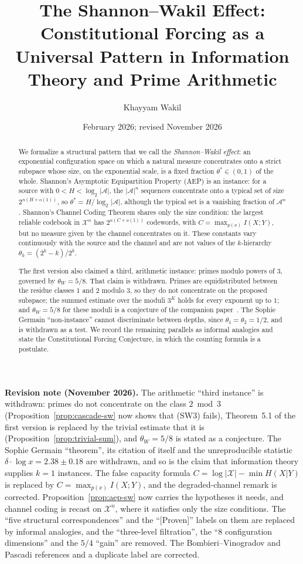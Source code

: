 \documentclass[12pt]{amsart}
\title[The Shannon--Wakil Effect]{The Shannon--Wakil Effect: Constitutional
  Forcing as a Universal Pattern in Information Theory and Prime Arithmetic}
\author{Khayyam Wakil}
\date{February 2026; revised November 2026}
\theoremstyle{plain}
\theoremstyle{definition}
\theoremstyle{remark}
\newcommand{\thetaW}{\theta_W}
\begin{document}
\begin{abstract}
We formalize a structural pattern that we call the \emph{Shannon--Wakil effect}:
an exponential configuration space on which a natural measure concentrates onto a
strict subspace whose size, on the exponential scale, is a fixed fraction
$\theta^* \in (0,1)$ of the whole. Shannon's Asymptotic Equipartition Property
(AEP) is an instance: for a source with $0 < H < \log_2|\mathcal{A}|$, the
$|\mathcal{A}|^n$ sequences concentrate onto a typical set of size
$2^{n(H+o(1))}$, so $\theta^* = H/\log_2|\mathcal{A}|$, although the typical set
is a vanishing fraction of $\mathcal{A}^n$. Shannon's Channel Coding Theorem
shares only the size condition: the largest reliable codebook in
$\mathcal{X}^n$ has $2^{n(C+o(1))}$ codewords, with $C = \max_{p(x)} I(X;Y)$,
but no measure given by the channel concentrates on it. These constants vary
continuously with the source and the channel and are not values of the
$k$-hierarchy $\theta_k = (2^k - k)/2^k$.

The first version also claimed a third, arithmetic instance: primes modulo powers
of $3$, governed by $\thetaW = 5/8$. That claim is withdrawn. Primes are
equidistributed between the residue classes $1$ and $2$ modulo $3$, so they do
not concentrate on the proposed subspace; the summed estimate over the moduli
$3^K$ holds for every exponent up to $1$; and $\thetaW = 5/8$ for these moduli is
a conjecture of the companion paper~\cite{WakilEisenstein}. The Sophie Germain
``non-instance'' cannot discriminate between depths, since
$\theta_1 = \theta_2 = 1/2$, and is withdrawn as a test. We record the remaining
parallels as informal analogies and state the Constitutional Forcing Conjecture,
in which the counting formula is a postulate.
\end{abstract}

\maketitle

\noindent\textbf{Revision note (November 2026).}
The arithmetic ``third instance'' is withdrawn: primes do not concentrate on the
class $2 \bmod 3$ (Proposition~\ref{prop:cascade-sw} now shows that (SW3) fails),
Theorem~5.1 of the first version is replaced by the trivial estimate that it is
(Proposition~\ref{prop:trivial-sum}), and $\thetaW = 5/8$ is stated as a conjecture.
The Sophie Germain ``theorem'', its citation of itself and the unreproducible
statistic $\delta \cdot \log x = 2.38 \pm 0.18$ are withdrawn, and so is the
claim that information theory supplies $k = 1$ instances. The false capacity
formula $C = \log|\mathcal{X}| - \min H(X|Y)$ is replaced by
$C = \max_{p(x)} I(X;Y)$, and the degraded-channel remark is corrected.
Proposition~\ref{prop:aep-sw} now carries the hypotheses it needs, and channel
coding is recast on $\mathcal{X}^n$, where it satisfies only the size conditions.
The ``five structural correspondences'' and the ``[Proven]'' labels on them are
replaced by informal analogies, and the ``three-level filtration'', the ``$8$
configuration dimensions'' and the $5/4$ ``gain'' are removed. The
Bombieri--Vinogradov and Pascadi references and a duplicate label are corrected.
\end{document}
